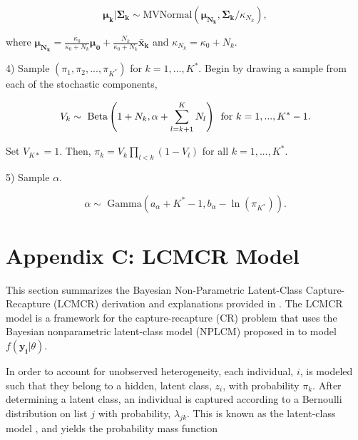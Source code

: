 \documentclass[
  12pt,
]{article}
\begin{document}
\begin{list}{}{}
\begin{equation}
\boldsymbol{\mu_k}|\boldsymbol{\Sigma_k} \sim \text{MVNormal}(\boldsymbol{\mu_{N_k}},\boldsymbol{\Sigma_k}/\kappa_{N_k} ),
\end{equation}

where $\boldsymbol{\mu_{N_k}}=\frac{\kappa_{0}}{\kappa_{0}+N_k}\boldsymbol{\mu_{0}} + \frac{N_k}{\kappa_{0}+N_k}\boldsymbol{\bar{x}_k} $ and $\kappa_{N_k}=\kappa_{0}+N_k$.

\item[4)] Sample $(\pi_1,\pi_2,...,\pi_{K^*})$ for $k=1,...,K^*$.  Begin by drawing a sample from each of the stochastic components,

\begin{equation}
 V_k \sim \text{ Beta}\left(1+N_k, \alpha+\sum_{l=k+1}^K N_l\right) \hspace{5px} \text{for } k=1,...,K^*-1.
\end{equation}

Set $V_{K*}=1$.  Then, $\pi_k = V_k\prod_{l<k}(1-V_l)$ for all $k=1,...,K^*$.

\item[5)] Sample $\alpha$.

\begin{equation}
  \alpha \sim \text{ Gamma}\left(a_\alpha + K^* -1, b_\alpha - \ln(\pi_{K^*}) \right).
\end{equation}

\end{list}

\section{Appendix C: LCMCR Model}
\label{LCMCRmodel}

This section summarizes the Bayesian Non-Parametric Latent-Class
Capture-Recapture (LCMCR) derivation and explanations provided in
\cite{manriquevallier_bayesian_2016}. The LCMCR model is a framework for
the capture-recapture (CR) problem that uses the Bayesian nonparametric
latent-class model (NPLCM) proposed in \cite{dunson_nonparametric_2009}
to model \(f(\boldsymbol{y_i}|\theta)\).

In order to account for unobserved heterogeneity, each individual,
\(i\), is modeled such that they belong to a hidden, latent class,
\(z_i\), with probability \(\pi_k\). After determining a latent class,
an individual is captured according to a Bernoulli distribution on list
\(j\) with probability, \(\lambda_{jk}\). This is known as the
latent-class model \citep{goodman_exploratory_1974}, and yields the
probability mass function
\end{document}
